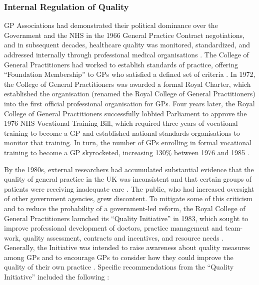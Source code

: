 \documentclass[12pt]{article}
\begin{document}
\subsubsection{Internal Regulation of Quality}

GP Associations had demonstrated their political dominance over the Government and the NHS in the 1966 General Practice Contract negotiations, and in subsequent decades, healthcare quality was monitored, standardized, and addressed internally through professional medical organisations \citep{howieQualityCoreValues2004}. The College of General Practitioners had worked to establish standards of practice, offering ``Foundation Membership'' to GPs who satisfied a defined set of criteria \citep{royalcollegeofgeneralpractitionersHistoryCollege}. In 1972, the College of General Practitioners was awarded a formal Royal Charter, which established the organisation (renamed the Royal College of General Practitioners) into the first official professional organisation for GPs. Four years later, the Royal College of General Practitioners successfully lobbied Parliament to approve the 1976 NHS Vocational Training Bill, which required three years of vocational training to become a GP and established national standards organisations to monitor that training. In turn, the number of GPs enrolling in formal vocational training to become a GP skyrocketed, increasing 130\% between 1976 and 1985 \citep{petcheyEndingGPQualitative1997}.

By the 1980s, external researchers had accumulated substantial evidence that the quality of general practice in the UK was inconsistent and that certain groups of patients were receiving inadequate care \citep{bakerQualityInitiativeRoyal1989}. The public, who had increased oversight of other government agencies, grew discontent. To mitigate some of this criticism and to reduce the probability of a government-led reform, the Royal College of General Practitioners launched its ``Quality Initiative'' in 1983, which sought to improve professional development of doctors, practice management and team-work, quality assessment, contracts and incentives, and resource needs \citep{practiceQualityAssured1985}. Generally, the Initiative was intended to raise awareness about quality measures among GPs and to encourage GPs to consider how they could improve the quality of their own practice \citep{bakerQualityInitiativeRoyal1989}. Specific recommendations from the ``Quality Initiative'' included the following \citep{britishmedicaljournalQualityGeneralPractice1985}:
\end{document}
